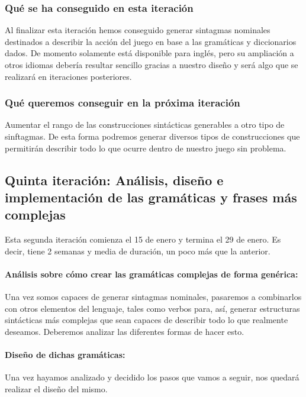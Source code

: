 \subsubsection{Qué se ha conseguido en esta iteración}

Al finalizar esta iteración hemos conseguido generar sintagmas nominales destinados a describir la acción del juego en base a las gramáticas y diccionarios dados. De momento solamente está disponible para inglés, pero su ampliación a otros idiomas debería resultar sencillo gracias a nuestro diseño y será algo que se realizará en iteraciones posteriores.

\subsubsection{Qué queremos conseguir en la próxima iteración}

Aumentar el rango de las construcciones sintácticas generables a otro tipo de sinftagmas. De esta forma podremos generar diversos tipos de construcciones que permitirán describir todo lo que ocurre dentro de nuestro juego sin problema.

\subsection{Quinta iteración: Análisis, diseño e implementación de las gramáticas y frases más complejas}

Esta segunda iteración comienza el 15 de enero y termina el 29 de enero. Es decir, tiene 2 semanas y media de duración, un poco más que la anterior.

\paragraph{Análisis sobre cómo crear las gramáticas complejas de forma genérica:} Una vez somos capaces de generar sintagmas nominales, pasaremos a combinarlos con otros elementos del lenguaje, tales como verbos para, así, generar estructuras sintácticas más complejas que sean capaces de describir todo lo que realmente deseamos. Deberemos analizar las diferentes formas de hacer esto.

\paragraph{Diseño de dichas gramáticas:} Una vez hayamos analizado y decidido los pasos que vamos a seguir, nos quedará realizar el diseño del mismo.

